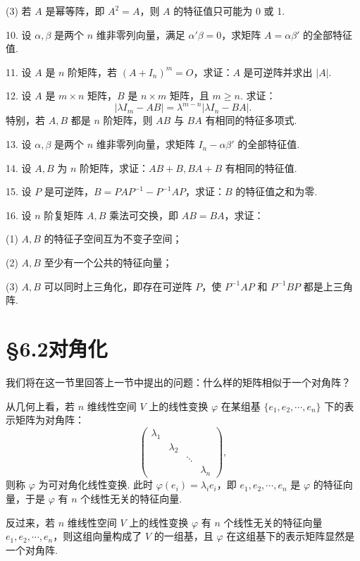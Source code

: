 \documentclass[UTF8,12pt,a4paper,fontset=fandol]{ctexart}
\begin{document}
(3) 若 $A$ 是幂等阵，即 $A^2=A$，则 $A$ 的特征值只可能为 0 或 1.

10. 设 $\alpha,\beta$ 是两个 $n$ 维非零列向量，满足 $\alpha'\beta=0$，求矩阵 $A=\alpha\beta'$ 的全部特征值.

11. 设 $A$ 是 $n$ 阶矩阵，若 $(A+I_n)^m=O$，求证：$A$ 是可逆阵并求出 $|A|$.

12. 设 $A$ 是 $m\times n$ 矩阵，$B$ 是 $n\times m$ 矩阵，且 $m\geq n$. 求证：
\[
|\lambda I_m-AB|=\lambda^{m-n}|\lambda I_n-BA|.
\]
特别，若 $A,B$ 都是 $n$ 阶矩阵，则 $AB$ 与 $BA$ 有相同的特征多项式.

13. 设 $\alpha,\beta$ 是两个 $n$ 维非零列向量，求矩阵 $I_n-\alpha\beta'$ 的全部特征值.

14. 设 $A,B$ 为 $n$ 阶矩阵，求证：$AB+B,BA+B$ 有相同的特征值.

15. 设 $P$ 是可逆阵，$B=PAP^{-1}-P^{-1}AP$，求证：$B$ 的特征值之和为零.

16. 设 $n$ 阶复矩阵 $A,B$ 乘法可交换，即 $AB=BA$，求证：

(1) $A,B$ 的特征子空间互为不变子空间；

(2) $A,B$ 至少有一个公共的特征向量；

(3) $A,B$ 可以同时上三角化，即存在可逆阵 $P$，使 $P^{-1}AP$ 和 $P^{-1}BP$ 都是上三角阵.

\section*{§6.2\quad 对角化}

我们将在这一节里回答上一节中提出的问题：什么样的矩阵相似于一个对角阵？

从几何上看，若 $n$ 维线性空间 $V$ 上的线性变换 $\varphi$ 在某组基 $\{e_1,e_2,\cdots,e_n\}$ 下的表示矩阵为对角阵：
\begin{equation}
\left(\begin{array}{cccc}
\lambda_1 & & & \\
& \lambda_2 & & \\
& & \ddots & \\
& & & \lambda_n
\end{array}\right),
\tag{6.2.1}
\end{equation}
则称 $\varphi$ 为可对角化线性变换. 此时 $\varphi(e_i)=\lambda_ie_i$，即 $e_1,e_2,\cdots,e_n$ 是 $\varphi$ 的特征向量，于是 $\varphi$ 有 $n$ 个线性无关的特征向量.

反过来，若 $n$ 维线性空间 $V$ 上的线性变换 $\varphi$ 有 $n$ 个线性无关的特征向量 $e_1,e_2,\cdots,e_n$，则这组向量构成了 $V$ 的一组基，且 $\varphi$ 在这组基下的表示矩阵显然是一个对角阵.
\end{document}
